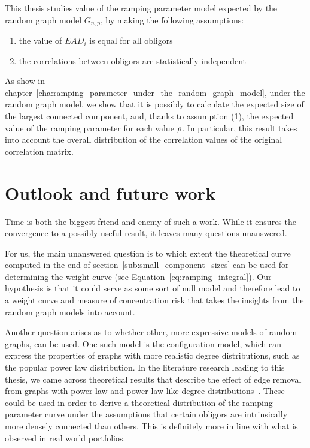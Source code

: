 This thesis studies value of the ramping parameter model expected by the random graph model $G_{n,p}$, by making the following assumptions:
\begin{enumerate}
	\item the value of $EAD_i$ is equal for all obligors
	\item the correlations between obligors are statistically independent
\end{enumerate}
As show in chapter~\ref{cha:ramping_parameter_under_the_random_graph_model}, under the random graph model, we show that it is possibly to calculate the expected size of the largest connected component, and, thanks to assumption (1), the expected value of the ramping parameter for each value $\rho$.
In particular, this result takes into account the overall distribution of the correlation values of the original correlation matrix.



\section{Outlook and future work}
\label{sec:future_work}

Time is both the biggest friend and enemy of such a work.
While it ensures the convergence to a possibly useful result, it leaves many questions unanswered. 

For us, the main unanswered question is to which extent the theoretical curve computed in the end of section~\ref{sub:small_component_sizes} can be used for determining the weight curve (see Equation~\vref{eq:ramping_integral}).
Our hypothesis is that it could serve as some sort of null model and therefore lead to a weight curve and measure of concentration risk that takes the insights from the random graph models into account.

Another question arises as to whether other, more expressive models of random graphs, can be used.
One such model is the configuration model, which can express the properties of graphs with more realistic degree distributions, such as the popular power law distribution.
In the literature research leading to this thesis, we came across theoretical results that describe the
effect of edge removal from graphs with power-law and power-law like degree distributions~\cite{dubois2012effect}.
These could be used in order to derive a theoretical distribution of the ramping parameter curve under the assumptions that certain obligors are intrinsically more densely connected than others.
This is definitely more in line with what is observed in real world portfolios.


